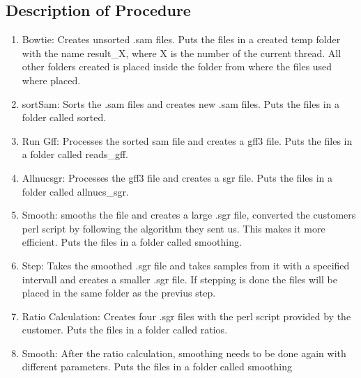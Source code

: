 \subsection{Description of Procedure}

\begin{enumerate}
\item Bowtie: Creates unsorted .sam files. Puts the files in a created temp folder with the name result\_X, where X is the number of the current thread. All other folders created is placed inside the folder from where the files used where placed.
\item sortSam: Sorts the .sam files and creates new .sam files. Puts the files in a folder called sorted.
\item Run Gff: Processes the sorted sam file and creates a gff3 file. Puts the files in a folder called reads\_gff.
\item Allnucsgr: Processes the gff3 file and creates a sgr file. Puts the files in a folder called allnucs\_sgr.
\item Smooth: smooths the file and creates a large .sgr file, converted the customers perl script by following the algorithm they  sent us. This makes it more efficient. Puts the files in a folder called smoothing.
\item Step: Takes the smoothed .sgr file and takes samples from it with a specified intervall and creates a smaller .sgr file. If stepping is done the files will be placed in the same folder as the previus step.
\item Ratio Calculation: Creates four .sgr files with the perl script provided by the customer. Puts the files in a folder called ratios.
\item Smooth: After the ratio calculation, smoothing needs to be done again with different parameters. Puts the files in a folder called smoothing
\end{enumerate}


